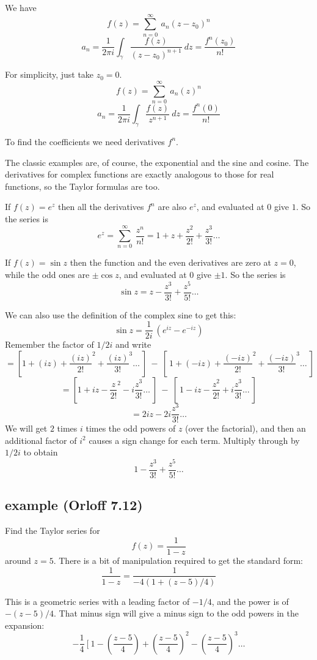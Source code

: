 \documentclass[11pt, oneside]{article}
\begin{document}
We have
\[ f(z) = \sum_{n=0}^{\infty} \ a_n(z - z_0)^n \]
\[ a_n = \frac{1}{2 \pi i} \int_{\gamma} \frac{f(z)}{(z - z_0)^{n+1}} \ dz = \frac{f^n (z_0)}{n!} \]

For simplicity, just take $z_0 = 0$.
\[ f(z) = \sum_{n=0}^{\infty} \ a_n(z)^n \]
\[ a_n = \frac{1}{2 \pi i} \int_{\gamma} \frac{f(z)}{z^{n+1}} \ dz = \frac{f^n (0)}{n!} \]

To find the coefficients we need derivatives $f^n$.

The classic examples are, of course, the exponential and the sine and cosine.  The derivatives for complex functions are exactly analogous to those for real functions, so the Taylor formulas are too.

If $f(z) = e^z$ then all the derivatives $f^n$ are also $e^z$, and evaluated at $0$ give $1$.  So the series is
\[ e^z = \sum_{n=0}^{\infty} \ \frac{z^n}{n!} = 1 + z + \frac{z^2}{2!} + \frac{z^3}{3!}  \dots \]

If $f(z) = \sin z$ then the function and the even derivatives are zero at $z = 0$, while the odd ones are $\pm \cos z$, and evaluated at $0$ give $\pm 1$.  So the series is
\[ \sin z =  z - \frac{z^3}{3!} + \frac{z^5}{5!}  \dots \]

We can also use the definition of the complex sine to get this:
\[ \sin z = \frac{1}{2i} \ (e^{iz} - e^{-iz}) \]
Remember the factor of $1/2i$ and write
\[ = [1 + (iz) + \frac{(iz)}{2!}^2 + \frac{(iz)}{3!}^3 \dots \ ] \  - \ [ \ 1 + (-iz) + \frac{(-iz)}{2!}^2 + \frac{(-iz)}{3!}^3 \dots \ ]  \]
\[ = [1 + iz - \frac{z}{2!}^2 - i \frac{z^3}{3!} \dots \ ] \  - \ [ \ 1 - iz - \frac{z^2}{2!} + i \frac{z^3}{3!} \dots \ ]  \]
\[ = 2iz -  2i \frac{z^3}{3!} \dots  \]
We will get $2$ times $i$ times the odd powers of $z$ (over the factorial), and then an additional factor of $i^2$ causes a sign change for each term.  Multiply through by $1/2i$ to obtain
\[ 1 - \frac{z^3}{3!} + \frac{z^5}{5!} \dots \]

\subsection*{example (Orloff 7.12)}

Find the Taylor series for 
\[ f(z) = \frac{1}{1 - z} \]
around $z = 5$.  There is a bit of manipulation required to get the standard form:
\[ \frac{1}{1 - z} = \frac{1}{-4(1 + (z-5)/4)} \]

This is a geometric series with a leading factor of $-1/4$, and the power is of $-(z - 5)/4$.  That minus sign will give a minus sign to the odd powers in the expansion:
\[ -\frac{1}{4} \ [ \ 1 - (\frac{z-5}{4}) + (\frac{z-5}{4})^2 - (\frac{z-5}{4})^3 \dots \]
\end{document}
